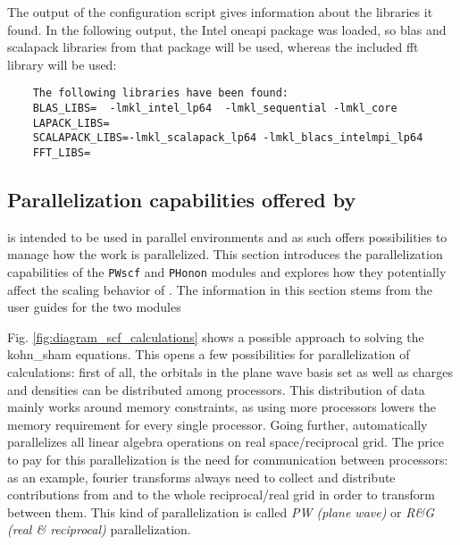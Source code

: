 \documentclass[main.tex]{subfiles}
\begin{document}
The output of the configuration script gives information about the libraries it found.
In the following output, the Intel \gls{oneapi} package was loaded, so \gls{blas} and \gls{scalapack} libraries from that package will be used, whereas the included \gls{fft} library will be used:
\begin{verbatim}
    The following libraries have been found:
    BLAS_LIBS=  -lmkl_intel_lp64  -lmkl_sequential -lmkl_core
    LAPACK_LIBS=
    SCALAPACK_LIBS=-lmkl_scalapack_lp64 -lmkl_blacs_intelmpi_lp64
    FFT_LIBS= 
\end{verbatim}

\subsection{Parallelization capabilities offered by \QE}\label{sub:qe_parallelization}

\QE is intended to be used in parallel environments and as such offers possibilities to manage how the work is parallelized.
This section introduces the parallelization capabilities of the \texttt{PWscf} and \texttt{PHonon} modules and explores how they potentially affect the scaling behavior of \QE. The information in this section stems from the user guides for the two modules \cite{noauthor_pwscf_nodate, noauthor_phonon_nodate}


Fig. \ref{fig:diagram_scf_calculations} shows a possible approach to solving the \acrshort{kohn_sham} equations.
This opens a few possibilities for parallelization of calculations: first of all, the orbitals in the plane wave basis set as well as charges and densities can be distributed among processors.
This distribution of data mainly works around memory constraints, as using more processors lowers the memory requirement for every single processor.
Going further, \QE automatically parallelizes all linear algebra operations on real space/reciprocal grid.
The price to pay for this parallelization is the need for communication between processors: as an example, fourier transforms always need to collect and distribute contributions from and to the whole reciprocal/real grid in order to transform between them.
This kind of parallelization is called \emph{PW (plane wave)} or \emph{R\&G (real \& reciprocal)} parallelization. 
\end{document}
